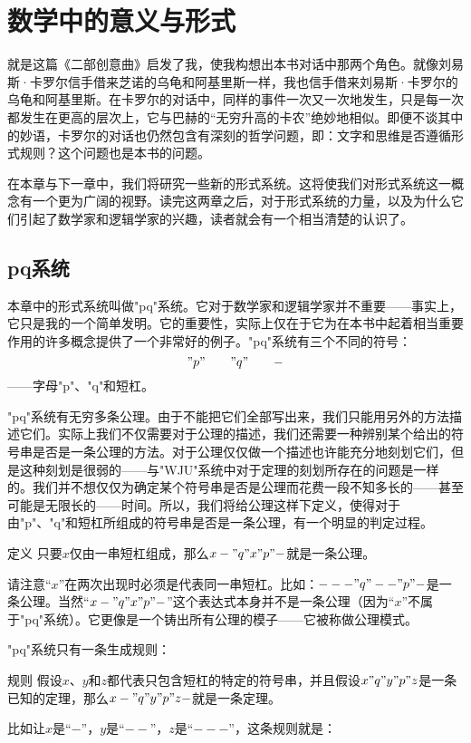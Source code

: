 
\chapter{数学中的意义与形式}

就是这篇《二部创意曲》启发了我，使我构想出本书对话中那两个角色。就像刘易斯·卡罗尔信手借来芝诺的乌龟和阿基里斯一样，我也信手借来刘易斯·卡罗尔的乌龟和阿基里斯。在卡罗尔的对话中，同样的事件一次又一次地发生，只是每一次都发生在更高的层次上，它与巴赫的“无穷升高的卡农”绝妙地相似。即便不谈其中的妙语，卡罗尔的对话也仍然包含有深刻的哲学问题，即：文字和思维是否遵循形式规则？这个问题也是本书的问题。

在本章与下一章中，我们将研究一些新的形式系统。这将使我们对形式系统这一概念有一个更为广阔的视野。读完这两章之后，对于形式系统的力量，以及为什么它们引起了数学家和逻辑学家的兴趣，读者就会有一个相当清楚的认识了。

\section{pq系统}

本章中的形式系统叫做"pq"系统。它对于数学家和逻辑学家并不重要——事实上，它只是我的一个简单发明。它的重要性，实际上仅在于它为在本书中起着相当重要作用的许多概念提供了一个非常好的例子。"pq"系统有三个不同的符号：
\[
  "p" \qquad "q" \qquad -
\]
——字母"p"、"q"和短杠。

"pq"系统有无穷多条公理。由于不能把它们全部写出来，我们只能用另外的方法描述它们。实际上我们不仅需要对于公理的描述，我们还需要一种辨别某个给出的符号串是否是一条公理的方法。对于公理仅仅做一个描述也许能充分地刻划它们，但是这种刻划是很弱的——与"WJU"系统中对于定理的刻划所存在的问题是一样的。我们并不想仅仅为确定某个符号串是否是公理而花费一段不知多长的——甚至可能是无限长的——时间。所以，我们将给公理这样下定义，使得对于由"p"、"q"和短杠所组成的符号串是否是一条公理，有一个明显的判定过程。

\begin{thm}{定义}
只要$x$仅由一串短杠组成，那么$x-"q"x"p"-$就是一条公理。
\end{thm}
请注意“$x$”在两次出现时必须是代表同一串短杠。比如：$---"q"--"p"-$是一条公理。当然“$x-"q"x"p"-$”这个表达式本身并不是一条公理（因为“$x$”不属于"pq"系统）。它更像是一个铸出所有公理的模子——它被称做公理模式。

"pq"系统只有一条生成规则：

\begin{thm}{规则}
假设$x$、$y$和$z$都代表只包含短杠的特定的符号串，并且假设$x"q"y"p"z$是一条已知的定理，那么$x-"q"y"p"z-$就是一条定理。
\end{thm}
比如让$x$是“$-$”，$y$是“$--$”，$z$是“$---$”，这条规则就是：

